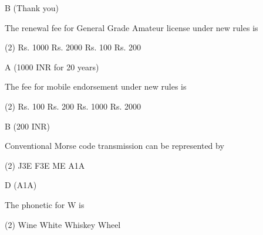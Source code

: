 \documentclass[a4paper]{article}
\begin{document}
\begin{solution}
	B (Thank you)
\end{solution}

\vspace{5mm}



\begin{question}The renewal fee for General Grade Amateur license under new rules is
	\begin{tasks}(2)
		\task Rs. 1000
		\task Rs. 2000
		\task Rs. 100
		\task Rs. 200
	\end{tasks}
\end{question}

\begin{solution}
	A (1000 INR for 20 years)
\end{solution}

\vspace{5mm}



\begin{question}The fee for mobile endorsement under new rules is
	\begin{tasks}(2)
		\task Rs. 100
		\task Rs. 200
		\task Rs. 1000
		\task Rs. 2000
	\end{tasks}
\end{question}

\begin{solution}
	B (200 INR)
\end{solution}

\vspace{5mm}



\begin{question}Conventional Morse code transmission can be represented by
	\begin{tasks}(2)
		\task J3E
		\task F3E
		\task ME
		\task A1A
	\end{tasks}
\end{question}

\begin{solution}
	D (A1A)
\end{solution}

\vspace{5mm}



\begin{question}The phonetic for \apostrophe{}W\apostrophe{} is
	\begin{tasks}(2)
		\task Wine
		\task White
		\task Whiskey
		\task Wheel
	\end{tasks}
\end{question}
\end{document}
